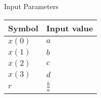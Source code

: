 \setlength{\arrayrulewidth}{0.3mm}
\setlength{\tabcolsep}{12pt}
\renewcommand{\arraystretch}{1.3}


\begin{center}
\caption{Input Parameters}
\begin{tabular}{ |p{2.0cm}|p{2.0cm}| }

\hline
 {Symbol}&{Input value}\\
\hline
$x(0) $ & $a$ \\
\hline
$x(1) $ & $b$ \\
\hline
$x(2) $ & $c$ \\
\hline
$x(3) $ & $d$ \\
\hline
$r$ & $\frac{b}{a}$\\
\hline

\end{tabular}
\end{center}
